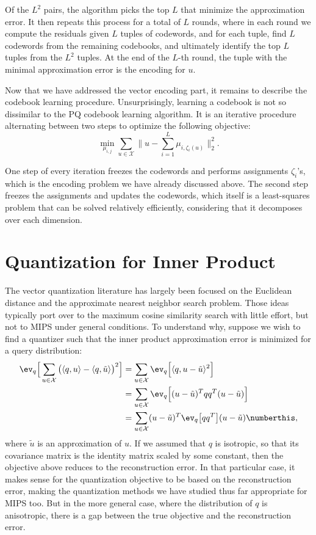 Of the $L^2$ pairs, the algorithm picks the top $L$ that minimize the approximation error.
It then repeats this process for a total of $L$ rounds, where in each
round we compute the residuals given $L$ tuples of codewords,
and for each tuple, find $L$ codewords from the remaining codebooks,
and ultimately identify the top $L$ tuples from the $L^2$ tuples.
At the end of the $L$-th round, the tuple with the minimal approximation error
is the encoding for $u$.

\bigskip

Now that we have addressed the vector encoding part, it remains to
describe the codebook learning procedure. Unsurprisingly, learning a codebook
is not so dissimilar to the PQ codebook learning algorithm.
It is an iterative procedure alternating between two steps to optimize
the following objective:
\begin{equation*}
    \min_{\mu_{i,j}} \sum_{u \in \mathcal{X}} \lVert u - \sum_{i=1}^L \mu_{i, \zeta_i(u)} \rVert_2^2.
\end{equation*}

One step of every iteration freezes the codewords and performs assignments $\zeta_i$'s,
which is the encoding problem we have already discussed above. The second step freezes
the assignments and updates the codewords, which itself is a least-squares problem
that can be solved relatively efficiently, considering that it decomposes over each dimension.

\section{Quantization for Inner Product}

The vector quantization literature has largely been focused on the Euclidean distance
and the approximate nearest neighbor search problem. Those ideas typically port over to
the maximum cosine similarity search with little effort, but not to MIPS under general conditions.
To understand why, suppose we wish to find a quantizer such that the 
inner product approximation error is minimized for a query distribution:
\begin{align*}
    \ev_{q} \Big[ \sum_{u \in \mathcal{X}} \big( \langle q, u \rangle - \langle q, \tilde{u} \rangle \big)^2 \Big] &= \sum_{u \in \mathcal{X}} \ev_q \Big[ \langle q, u - \tilde{u} \rangle^2 \Big] \\
    &= \sum_{u \in \mathcal{X}} \ev_q \Big[ (u - \tilde{u})^T qq^T (u - \tilde{u}) \Big] \\
    &= \sum_{u \in \mathcal{X}} (u - \tilde{u})^T \ev_q \big[ qq^T \big] (u - \tilde{u})
    \numberthis \label{equation:quantization:mips-objective},
\end{align*}
where $\tilde{u}$ is an approximation of $u$.
If we assumed that $q$ is isotropic, so that its covariance matrix is the identity matrix
scaled by some constant,
then the objective above reduces to the reconstruction error. In that particular case,
it makes sense for the quantization objective to be based on the reconstruction error,
making the quantization methods we have studied thus far appropriate for MIPS too.
But in the more general case, where the distribution of $q$ is anisotropic, there is
a gap between the true objective and the reconstruction error.

